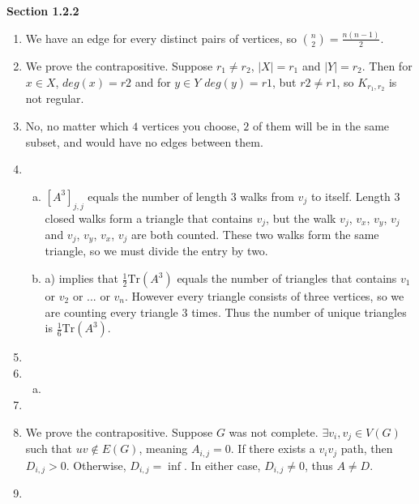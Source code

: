 \documentclass[11pt]{article}
\begin{document}
{\bfseries Section 1.2.2}

\begin{enumerate}[1]
    \item %
        We have an edge for every distinct pairs of vertices, so
        $\binom{n}{2} = \frac{n(n-1)}{2}$.
    \item %
        We prove the contrapositive. Suppose $r_1 \neq r_2$, $|X| = r_1$ and 
        $|Y| = r_2$. Then for $x \in X$, $deg(x) = r2$ and for $y \in Y$ 
        $deg(y) = r1$, but $r2 \neq r1$, so $K_{r_1, r_2}$ is not regular.
    \item %
        No, no matter which $4$ vertices you choose, $2$ of them will be in the 
        same subset, and would have no edges between them. 
    \item %
        \begin{enumerate}[a)]
            \item
                $[A^3]_{j,j}$ equals the number of length $3$ walks from $v_j$ to 
                itself. Length $3$ closed walks form a triangle that contains 
                $v_j$, but the walk $v_j$, $v_x$, $v_y$, $v_j$ and 
                $v_j$, $v_y$, $v_x$, $v_j$ are both counted. These two walks form the 
                same triangle, so we must divide the entry by two. 
            \item
                a) implies that $\frac{1}{2}\text{Tr}(A^3)$ equals the number of 
                triangles that contains $v_1$ or $v_2$ or ... or $v_n$. However 
                every triangle consists of three vertices, so we are counting 
                every triangle 3 times. Thus the number of unique triangles is 
                $\frac{1}{6}\text{Tr}(A^3)$.
        \end{enumerate}
    \item %

    \item %
        \begin{enumerate}[a)]
            \item
        \end{enumerate}

    \item %

    \item %
        We prove the contrapositive. Suppose $G$ was not complete. $\exists v_i,v_j 
        \in V(G)$ such that $uv \notin E(G)$, meaning $A_{i,j} = 0$. If there exists
        a $v_iv_j$ path, then $D_{i, j} > 0$. Otherwise, $D_{i, j} = \inf$. In either
        case, $D_{i, j} \neq 0$, thus $A \neq D$. 

    \item %
        
\end{enumerate}
\end{document}
